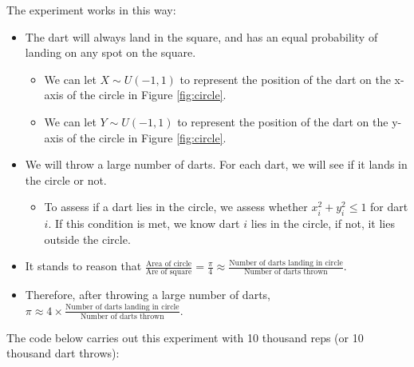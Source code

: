 \documentclass[
]{book}
\providecommand{\tightlist}{%
  \setlength{\itemsep}{0pt}\setlength{\parskip}{0pt}}
\begin{document}
The experiment works in this way:

\begin{itemize}
\tightlist
\item
  The dart will always land in the square, and has an equal probability of landing on any spot on the square.

  \begin{itemize}
  \tightlist
  \item
    We can let \(X \sim U(-1,1)\) to represent the position of the dart on the x-axis of the circle in Figure \ref{fig:circle}.
  \item
    We can let \(Y \sim U(-1,1)\) to represent the position of the dart on the y-axis of the circle in Figure \ref{fig:circle}.
  \end{itemize}
\item
  We will throw a large number of darts. For each dart, we will see if it lands in the circle or not.

  \begin{itemize}
  \tightlist
  \item
    To assess if a dart lies in the circle, we assess whether \(x_i^2 + y_i^2 \leq 1\) for dart \(i\). If this condition is met, we know dart \(i\) lies in the circle, if not, it lies outside the circle.
  \end{itemize}
\item
  It stands to reason that \(\frac{\text{Area of circle}}{\text{Are of square}} = \frac{\pi}{4} \approx \frac{\text{Number of darts landing in circle}}{\text{Number of darts thrown}}\).
\item
  Therefore, after throwing a large number of darts, \(\pi \approx 4 \times \frac{\text{Number of darts landing in circle}}{\text{Number of darts thrown}}.\)
\end{itemize}

The code below carries out this experiment with 10 thousand reps (or 10 thousand dart throws):
\end{document}
